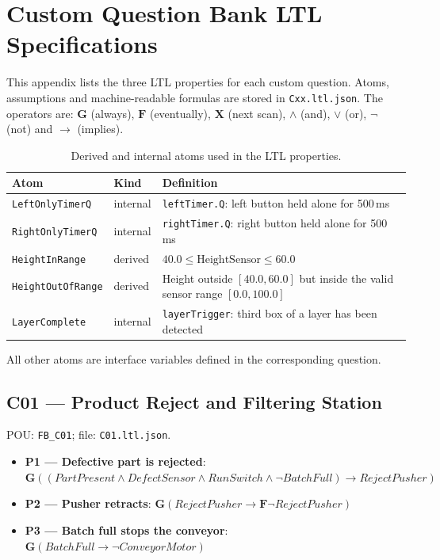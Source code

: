 
\section{Custom Question Bank LTL Specifications}
\label{app:custom_ltl}

This appendix lists the three LTL properties for each custom question. Atoms, assumptions and machine-readable formulas are stored in \texttt{Cxx.ltl.json}. The operators are: $\mathbf{G}$ (always), $\mathbf{F}$ (eventually), $\mathbf{X}$ (next scan), $\wedge$ (and), $\vee$ (or), $\neg$ (not) and $\rightarrow$ (implies).

\begin{table}[htbp]
\centering
\small
\caption{Derived and internal atoms used in the LTL properties.}
\label{tab:custom_atoms}
\begin{tabular}{|l|l|p{}|}
\hline
Atom & Kind & Definition \\
\hline
\texttt{LeftOnlyTimerQ} & internal & \texttt{leftTimer.Q}: left button held alone for 500\,ms \\
\texttt{RightOnlyTimerQ} & internal & \texttt{rightTimer.Q}: right button held alone for 500\,ms \\
\texttt{HeightInRange} & derived & $40.0 \le \mathrm{HeightSensor} \le 60.0$ \\
\texttt{HeightOutOfRange} & derived & Height outside $[40.0, 60.0]$ but inside the valid sensor range $[0.0, 100.0]$ \\
\texttt{LayerComplete} & internal & \texttt{layerTrigger}: third box of a layer has been detected \\
\hline
\end{tabular}
\end{table}

All other atoms are interface variables defined in the corresponding question.

\subsection*{C01 --- Product Reject and Filtering Station}
\noindent POU: \texttt{FB\_C01}; file: \texttt{C01.ltl.json}.
\begin{small}
\begin{itemize}
\item \textbf{P1 --- Defective part is rejected}: $\mathbf{G}((PartPresent \wedge DefectSensor \wedge RunSwitch \wedge \neg BatchFull) \rightarrow RejectPusher)$
\item \textbf{P2 --- Pusher retracts}: $\mathbf{G}(RejectPusher \rightarrow \mathbf{F} \neg RejectPusher)$
\item \textbf{P3 --- Batch full stops the conveyor}: $\mathbf{G}(BatchFull \rightarrow \neg ConveyorMotor)$
\end{itemize}
\end{small}

